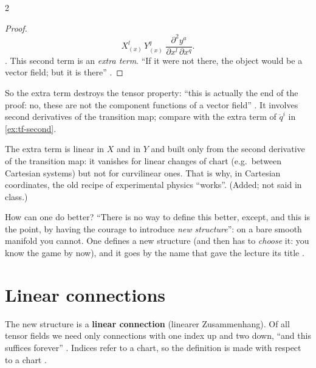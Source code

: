 \begin{paracol}{2}
\begin{proof}
\[
  X^l_{(x)}\,Y^q_{(x)}\;\frac{\partial^2y^a}{\partial x^l\,\partial x^q} .
\]
. This second term is an \emph{extra term}. ``If it were not there, the object would be a vector field; but it is
there'' .
\end{proof}
So the extra term destroys the tensor property: ``this is actually the end of the proof: no, these are not the component functions
of a vector field'' .
It involves second derivatives of the transition map; compare with the extra term of $\ddot q^i$ in \cref{ex:tf-second}.
\begin{coursenote}
The extra term is linear in $X$ and in $Y$ and built only from the second derivative of the transition map: it vanishes for
linear changes of chart (e.g.\ between Cartesian systems) but not for curvilinear ones. That is why, in
Cartesian coordinates, the old recipe of experimental physics ``works''. (Added; not said in class.)
\end{coursenote}
How can one do better? ``There is no way to define this better, except, and this is the point, by having the courage to introduce
\emph{new structure}'': on a bare smooth manifold you cannot. One defines a new structure (and then has to \emph{choose} it:
you know the game by now), and it goes by the name that gave the lecture its title .

\section{Linear connections}\label{sec:cf-connections}

The new structure is a \textbf{linear connection} (linearer Zusammenhang). Of all tensor fields we need only connections with
one index up and two down, ``and this suffices forever'' . Indices refer to a chart, so the definition is made
with respect to a chart .


\end{paracol}
